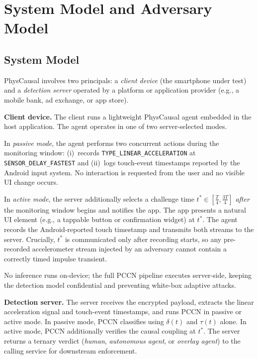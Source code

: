 \section{System Model and Adversary Model}
\label{sec:sysmodel}

\subsection{System Model}

PhysCausal involves two principals: a \textit{client device} (the smartphone under
test) and a \textit{detection server} operated by a platform or application provider
(e.g., a mobile bank, ad exchange, or app store).%

\noindent\textbf{Client device.}
The client runs a lightweight PhysCausal agent embedded in the host application.%
The agent operates in one of two server-selected modes.%

In \textit{passive mode}, the agent performs two concurrent actions during the
monitoring window: (i)~records \texttt{TYPE\_LINEAR\_ACCELERATION} at
\texttt{SENSOR\_DELAY\_FASTEST} and (ii)~logs touch-event timestamps reported by the
Android input system.%
No interaction is requested from the user and no visible UI change occurs.%

In \textit{active mode}, the server additionally selects a challenge time
$t^* \in [\frac{T}{4}, \frac{3T}{4}]$ \textit{after} the monitoring window begins and
notifies the app.%
The app presents a natural UI element (e.g., a tappable button or confirmation widget)
at $t^*$.%
The agent records the Android-reported touch timestamp and transmits both streams to
the server.%
Crucially, $t^*$ is communicated only after recording starts, so any pre-recorded
accelerometer stream injected by an adversary cannot contain a correctly timed
impulse transient.%

No inference runs on-device; the full PCCN pipeline executes server-side, keeping
the detection model confidential and preventing white-box adaptive attacks.%

\noindent\textbf{Detection server.}
The server receives the encrypted payload, extracts the linear acceleration signal and
touch-event timestamps, and runs PCCN in passive or active mode.%
In passive mode, PCCN classifies using $\delta(t)$ and $\tau(t)$ alone.%
In active mode, PCCN additionally verifies the causal coupling at $t^*$.%
The server returns a ternary verdict (\textit{human}, \textit{autonomous agent},
or \textit{overlay agent}) to the calling service for downstream enforcement.%

